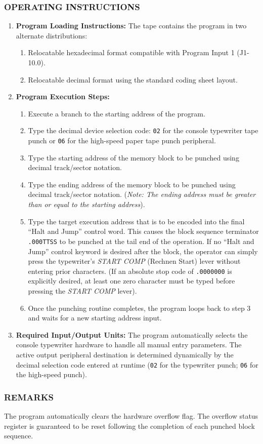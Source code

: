 \subsubsection*{OPERATING INSTRUCTIONS}
\begin{enumerate}
    \item \textbf{Program Loading Instructions:} The tape contains the program in two alternate distributions:
    \begin{enumerate}[label=\alph*)]
        \item Relocatable hexadecimal format compatible with Program Input 1 (J1-10.0).
        \item Relocatable decimal format using the standard coding sheet layout.
    \end{enumerate}
    
    \item \textbf{Program Execution Steps:}
    \begin{enumerate}
        \item Execute a branch to the starting address of the program.
        \item Type the decimal device selection code: \texttt{02} for the console typewriter tape punch or \texttt{06} for the high-speed paper tape punch peripheral.
        \item Type the starting address of the memory block to be punched using decimal track/sector notation.
        \item Type the ending address of the memory block to be punched using decimal track/sector notation. (\textit{Note: The ending address must be greater than or equal to the starting address}).
        \item Type the target execution address that is to be encoded into the final ``Halt and Jump'' control word. This causes the block sequence terminator \texttt{.000TTSS} to be punched at the tail end of the operation. If no ``Halt and Jump'' control keyword is desired after the block, the operator can simply press the typewriter's \textit{START COMP} (Rechnen Start) lever without entering prior characters. (If an absolute stop code of \texttt{.0000000} is explicitly desired, at least one zero character must be typed before pressing the \textit{START COMP} lever).
        \item Once the punching routine completes, the program loops back to step 3 and waits for a new starting address input.
    \end{enumerate}

    \item \textbf{Required Input/Output Units:}
    The program automatically selects the console typewriter hardware to handle all manual entry parameters. The active output peripheral destination is determined dynamically by the decimal selection code entered at runtime (\texttt{02} for the typewriter punch; \texttt{06} for the high-speed punch).
\end{enumerate}

\subsubsection*{REMARKS}
The program automatically clears the hardware overflow flag. The overflow status register is guaranteed to be reset following the completion of each punched block sequence.
\newpage